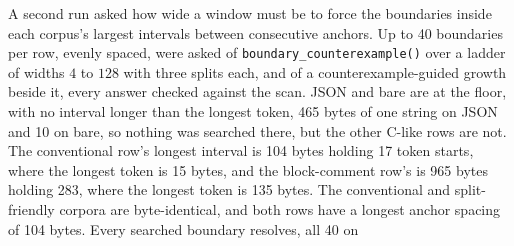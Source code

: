 \documentclass[11pt,a4paper]{article}
\theoremstyle{definition}
\theoremstyle{plain}
\newcommand{\code}[1]{\texttt{#1}}
\begin{document}
A second run asked how wide a window must be to force the boundaries inside each corpus's largest intervals between
consecutive anchors. Up to 40 boundaries per row, evenly spaced, were asked of \code{boundary\_counterexample()} over a
ladder of widths $4$ to $128$ with three splits each, and of a counterexample-guided growth beside it, every answer
checked against the scan. JSON and bare are at the floor, with no interval longer than the longest token, 465 bytes of
one string on JSON and 10 on bare, so nothing was searched there, but the other C-like rows are not. The conventional
row's longest interval is 104 bytes holding 17 token starts, where the longest token is 15 bytes, and the block-comment
row's is 965 bytes holding 283, where the longest token is 135 bytes. The conventional and split-friendly corpora are
byte-identical, and both rows have a longest anchor spacing of 104 bytes. Every searched boundary resolves, all 40 on
\end{document}
